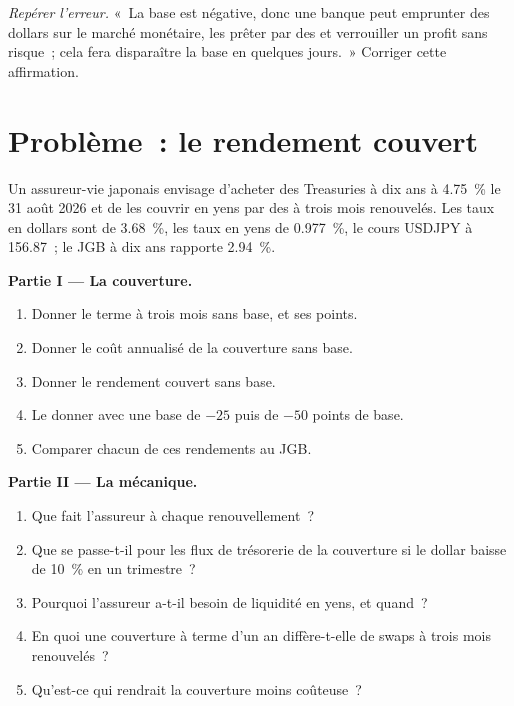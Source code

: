 \begin{exercise}[$\star\star\star$]\label{exo:m2:fx-swaps-forwards-and-the-cross-currency-basis:8}
\emph{Repérer l'erreur.} «~La base est négative, donc une banque peut emprunter des dollars sur
le marché monétaire, les prêter par des  et verrouiller un profit sans risque~;
cela fera disparaître la base en quelques jours.~» Corriger cette affirmation.
\end{exercise}

\section{Problème~: le rendement couvert}

\begin{problem}\label{pb:m2:fx-swaps-forwards-and-the-cross-currency-basis:1}
Un assureur-vie japonais envisage d'acheter des Treasuries à dix ans à 4.75~\% le 31
août 2026 et de les couvrir en yens par des  à trois mois renouvelés. Les
taux en dollars sont de 3.68~\%, les taux en yens de 0.977~\%, le cours USDJPY à 156.87~; le JGB à dix ans rapporte 2.94~\%.

\medskip\noindent\textbf{Partie I --- La couverture.}
\begin{enumerate}
\item Donner le terme à trois mois sans base, et ses points.
\item Donner le coût annualisé de la couverture sans base.
\item Donner le rendement couvert sans base.
\item Le donner avec une base de $-25$ puis de $-50$ points de base.
\item Comparer chacun de ces rendements au JGB.
\end{enumerate}

\medskip\noindent\textbf{Partie II --- La mécanique.}
\begin{enumerate}[resume]
\item Que fait l'assureur à chaque renouvellement~?
\item Que se passe-t-il pour les flux de trésorerie de la couverture si le dollar baisse de 10~\% en un trimestre~?
\item Pourquoi l'assureur a-t-il besoin de liquidité en yens, et quand~?
\item En quoi une couverture à terme d'un an diffère-t-elle de swaps à trois mois renouvelés~?
\item Qu'est-ce qui rendrait la couverture moins coûteuse~?
\end{enumerate}


\end{problem}
